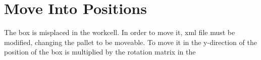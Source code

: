 \section{Move Into Positions}

The box is misplaced in the workcell.
In order to move it, xml file must be modified, changing the pallet to be moveable.
To move it in the y-direction of the position of the box is multiplied by the rotation matrix in the 
